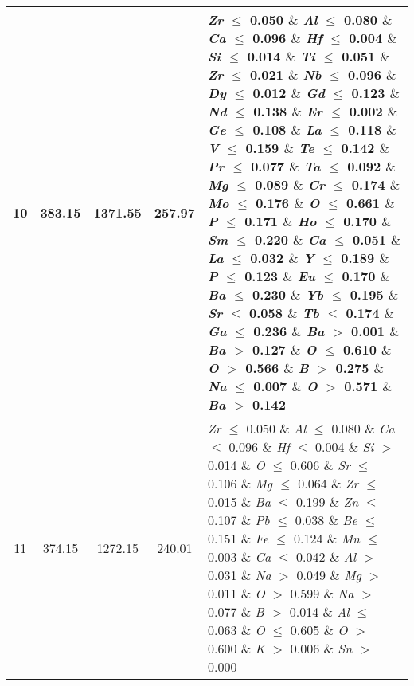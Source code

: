 \begin{table}[!htbp]
\begin{tabular}{ccccp{}}
		\hline
		10 & 383.15 & 1371.55 & 257.97 & \textit{Zr} $\le$ 0.050 $\&$ \textit{Al} $\le$ 0.080 $\&$ \textit{Ca} $\le$ 0.096 $\&$ \textit{Hf} $\le$ 0.004 $\&$ \textit{Si} $\le$ 0.014 $\&$ \textit{Ti} $\le$ 0.051 $\&$ \textit{Zr} $\le$ 0.021 $\&$ \textit{Nb} $\le$ 0.096 $\&$ \textit{Dy} $\le$ 0.012 $\&$ \textit{Gd} $\le$ 0.123 $\&$ \textit{Nd} $\le$ 0.138 $\&$ \textit{Er} $\le$ 0.002 $\&$ \textit{Ge} $\le$ 0.108 $\&$ \textit{La} $\le$ 0.118 $\&$ \textit{V} $\le$ 0.159 $\&$ \textit{Te} $\le$ 0.142 $\&$ \textit{Pr} $\le$ 0.077 $\&$ \textit{Ta} $\le$ 0.092 $\&$ \textit{Mg} $\le$ 0.089 $\&$ \textit{Cr} $\le$ 0.174 $\&$ \textit{Mo} $\le$ 0.176 $\&$ \textit{O} $\le$ 0.661 $\&$ \textit{P} $\le$ 0.171 $\&$ \textit{Ho} $\le$ 0.170 $\&$ \textit{Sm} $\le$ 0.220 $\&$ \textit{Ca} $\le$ 0.051 $\&$ \textit{La} $\le$ 0.032 $\&$ \textit{Y} $\le$ 0.189 $\&$ \textit{P} $\le$ 0.123 $\&$ \textit{Eu} $\le$ 0.170 $\&$ \textit{Ba} $\le$ 0.230 $\&$ \textit{Yb} $\le$ 0.195 $\&$ \textit{Sr} $\le$ 0.058 $\&$ \textit{Tb} $\le$ 0.174 $\&$ \textit{Ga} $\le$ 0.236 $\&$ \textit{Ba} $>$ 0.001 $\&$ \textit{Ba} $>$ 0.127 $\&$ \textit{O} $\le$ 0.610 $\&$ \textit{O} $>$ 0.566 $\&$ \textit{B} $>$ 0.275 $\&$ \textit{Na} $\le$ 0.007 $\&$ \textit{O} $>$ 0.571 $\&$ \textit{Ba} $>$ 0.142\\
		\hline
		11 & 374.15 & 1272.15 & 240.01 & \textit{Zr} $\le$ 0.050 $\&$ \textit{Al} $\le$ 0.080 $\&$ \textit{Ca} $\le$ 0.096 $\&$ \textit{Hf} $\le$ 0.004 $\&$ \textit{Si} $>$ 0.014 $\&$ \textit{O} $\le$ 0.606 $\&$ \textit{Sr} $\le$ 0.106 $\&$ \textit{Mg} $\le$ 0.064 $\&$ \textit{Zr} $\le$ 0.015 $\&$ \textit{Ba} $\le$ 0.199 $\&$ \textit{Zn} $\le$ 0.107 $\&$ \textit{Pb} $\le$ 0.038 $\&$ \textit{Be} $\le$ 0.151 $\&$ \textit{Fe} $\le$ 0.124 $\&$ \textit{Mn} $\le$ 0.003 $\&$ \textit{Ca} $\le$ 0.042 $\&$ \textit{Al} $>$ 0.031 $\&$ \textit{Na} $>$ 0.049 $\&$ \textit{Mg} $>$ 0.011 $\&$ \textit{O} $>$ 0.599 $\&$ \textit{Na} $>$ 0.077 $\&$ \textit{B} $>$ 0.014 $\&$ \textit{Al} $\le$ 0.063 $\&$ \textit{O} $\le$ 0.605 $\&$ \textit{O} $>$ 0.600 $\&$ \textit{K} $>$ 0.006 $\&$ \textit{Sn} $>$ 0.000\\
		\bottomrule
	\end{tabular}
\end{table}
